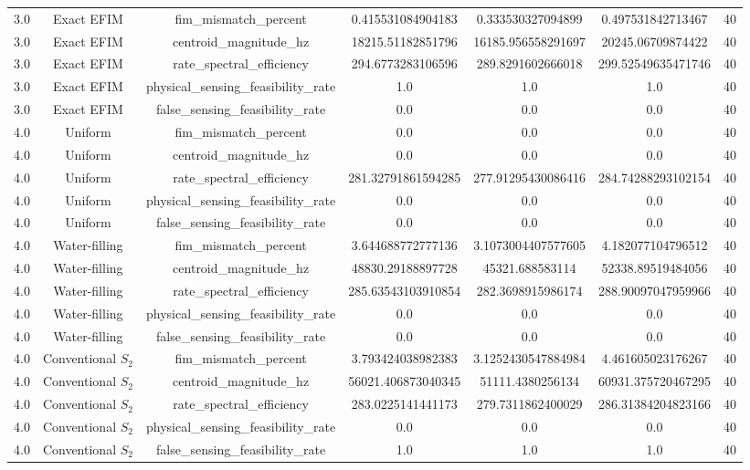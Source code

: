 \begin{table}[t]
\begin{tabular}{lcccccc}
3.0 & Exact EFIM & fim_mismatch_percent & 0.415531084904183 & 0.333530327094899 & 0.497531842713467 & 40 \\
3.0 & Exact EFIM & centroid_magnitude_hz & 18215.51182851796 & 16185.956558291697 & 20245.06709874422 & 40 \\
3.0 & Exact EFIM & rate_spectral_efficiency & 294.6773283106596 & 289.8291602666018 & 299.52549635471746 & 40 \\
3.0 & Exact EFIM & physical_sensing_feasibility_rate & 1.0 & 1.0 & 1.0 & 40 \\
3.0 & Exact EFIM & false_sensing_feasibility_rate & 0.0 & 0.0 & 0.0 & 40 \\
4.0 & Uniform & fim_mismatch_percent & 0.0 & 0.0 & 0.0 & 40 \\
4.0 & Uniform & centroid_magnitude_hz & 0.0 & 0.0 & 0.0 & 40 \\
4.0 & Uniform & rate_spectral_efficiency & 281.32791861594285 & 277.91295430086416 & 284.74288293102154 & 40 \\
4.0 & Uniform & physical_sensing_feasibility_rate & 0.0 & 0.0 & 0.0 & 40 \\
4.0 & Uniform & false_sensing_feasibility_rate & 0.0 & 0.0 & 0.0 & 40 \\
4.0 & Water-filling & fim_mismatch_percent & 3.644688772777136 & 3.1073004407577605 & 4.182077104796512 & 40 \\
4.0 & Water-filling & centroid_magnitude_hz & 48830.29188897728 & 45321.688583114 & 52338.89519484056 & 40 \\
4.0 & Water-filling & rate_spectral_efficiency & 285.63543103910854 & 282.3698915986174 & 288.90097047959966 & 40 \\
4.0 & Water-filling & physical_sensing_feasibility_rate & 0.0 & 0.0 & 0.0 & 40 \\
4.0 & Water-filling & false_sensing_feasibility_rate & 0.0 & 0.0 & 0.0 & 40 \\
4.0 & Conventional $S_2$ & fim_mismatch_percent & 3.793424038982383 & 3.1252430547884984 & 4.461605023176267 & 40 \\
4.0 & Conventional $S_2$ & centroid_magnitude_hz & 56021.406873040345 & 51111.4380256134 & 60931.375720467295 & 40 \\
4.0 & Conventional $S_2$ & rate_spectral_efficiency & 283.0225141441173 & 279.7311862400029 & 286.31384204823166 & 40 \\
4.0 & Conventional $S_2$ & physical_sensing_feasibility_rate & 0.0 & 0.0 & 0.0 & 40 \\
4.0 & Conventional $S_2$ & false_sensing_feasibility_rate & 1.0 & 1.0 & 1.0 & 40 \\

\end{tabular}
\end{table}

